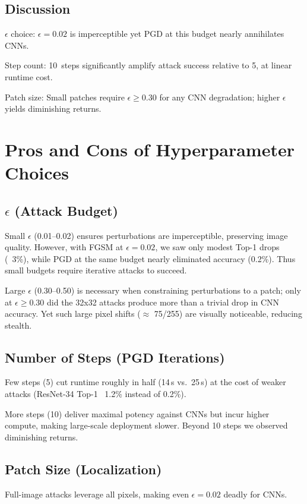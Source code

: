 \documentclass[twoside,11pt]{article}
\begin{document}
\subsection*{Discussion}
$\epsilon$ choice: $\epsilon=0.02$ is imperceptible yet PGD at this budget nearly annihilates CNNs.

Step count: 10 steps significantly amplify attack success relative to 5, at linear runtime cost.

Patch size: Small patches require $\epsilon\ge0.30$ for any CNN degradation; higher $\epsilon$ yields diminishing returns.

\section{Pros and Cons of Hyperparameter Choices}

\subsection{$\epsilon$ (Attack Budget)}
Small $\epsilon$ (0.01--0.02) ensures perturbations are imperceptible, preserving image quality. However, with FGSM at $\epsilon=0.02$, we saw only modest Top-1 drops (~3\%), while PGD at the same budget nearly eliminated accuracy (0.2\%). Thus small budgets require iterative attacks to succeed.

Large $\epsilon$ (0.30--0.50) is necessary when constraining perturbations to a patch; only at $\epsilon\ge0.30$ did the 32x32 attacks produce more than a trivial drop in CNN accuracy. Yet such large pixel shifts ($\approx$ 75/255) are visually noticeable, reducing stealth.

\subsection{Number of Steps (PGD Iterations)}
Few steps (5) cut runtime roughly in half (14\,s vs.\ 25\,s) at the cost of weaker attacks (ResNet-34 Top-1 ~1.2\% instead of 0.2\%).

More steps (10) deliver maximal potency against CNNs but incur higher compute, making large-scale deployment slower. Beyond 10 steps we observed diminishing returns.

\subsection{Patch Size (Localization)}
Full-image attacks leverage all pixels, making even $\epsilon=0.02$ deadly for CNNs.
\end{document}
